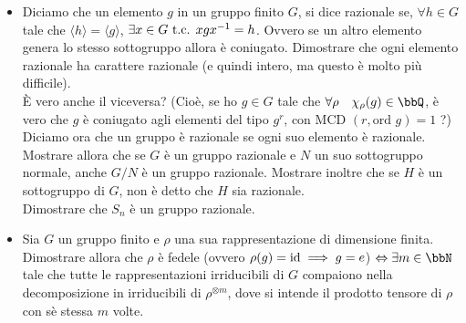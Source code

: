 \documentclass[a4paper,NoNotes,GeneralMath]{stdmdoc}
\newcommand{\Ord}{\text{ord }}
\newcommand{\gen}[1]{\langle #1 \rangle}
\newcommand{\MCD}{\text{MCD }}
\begin{document}
\begin{itemize}
		\item Diciamo che un elemento $g$ in un gruppo finito $G$, si dice razionale se, $\forall h \in G$ tale che $\gen{h} = \gen{g}$, $\exists x \in G \mbox{ t.c. } xgx^{-1} = h$. Ovvero se un altro elemento genera lo stesso sottogruppo allora è coniugato. Dimostrare che ogni elemento razionale ha carattere razionale (e quindi intero, ma questo è molto più difficile). \\
			È vero anche il viceversa? (Cioè, se ho $g \in G$ tale che $\forall \rho \quad \chi_\rho(g) \in \bbQ$, è vero che $g$ è coniugato agli elementi del tipo $g^r$, con $\MCD(r, \Ord g) = 1$ ?)\\
			Diciamo ora che un gruppo è razionale se ogni suo elemento è razionale. Mostrare allora che se $G$ è un gruppo razionale e $N$ un suo sottogruppo normale, anche $G/N$ è un gruppo razionale. Mostrare inoltre che se $H$ è un sottogruppo di $G$, non è detto che $H$ sia razionale. \\
			Dimostrare che $S_n$ è un gruppo razionale.
		
		\item Sia $G$ un gruppo finito e $\rho$ una sua rappresentazione di dimensione finita. Dimostrare allora che $\rho$ è fedele (ovvero $\rho(g) = \mbox{id} \implies g = e$) $\sse \exists m \in \bbN $ tale che tutte le rappresentazioni irriducibili di $G$ compaiono nella decomposizione in irriducibili di $\rho^{\otimes m}$, dove si intende il prodotto tensore di $\rho$ con sè stessa $m$ volte.
	\end{itemize}
\end{document}
